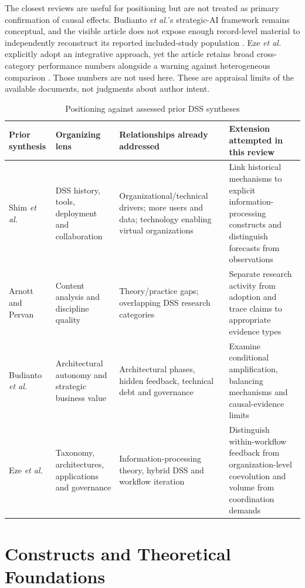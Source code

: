 \documentclass[journal]{IEEEtran}
\begin{document}
The closest reviews are useful for positioning but are not treated as primary confirmation of causal effects. Budianto \emph{et al.}'s strategic-AI framework remains conceptual, and the visible article does not expose enough record-level material to independently reconstruct its reported included-study population \cite{Budianto2026}. Eze \emph{et al.} explicitly adopt an integrative approach, yet the article retains broad cross-category performance numbers alongside a warning against heterogeneous comparison \cite{Eze2026}. Those numbers are not used here. These are appraisal limits of the available documents, not judgments about author intent.

\begin{table}[t]
\caption{Positioning against assessed prior DSS syntheses}
\label{tab:prior}
\centering\footnotesize\setlength{\tabcolsep}{4pt}
\begin{tabular}{p{}p{}p{}p{}}
\toprule
Prior synthesis & Organizing lens & Relationships already addressed & Extension attempted in this review \\
\midrule
Shim \emph{et al.} \cite{shim2002} & DSS history, tools, deployment and collaboration & Organizational/technical drivers; more users and data; technology enabling virtual organizations & Link historical mechanisms to explicit information-processing constructs and distinguish forecasts from observations \\
Arnott and Pervan \cite{arnott2008} & Content analysis and discipline quality & Theory/practice gaps; overlapping DSS research categories & Separate research activity from adoption and trace claims to appropriate evidence types \\
Budianto \emph{et al.} \cite{Budianto2026} & Architectural autonomy and strategic business value & Architectural phases, hidden feedback, technical debt and governance & Examine conditional amplification, balancing mechanisms and causal-evidence limits \\
Eze \emph{et al.} \cite{Eze2026} & Taxonomy, architectures, applications and governance & Information-processing theory, hybrid DSS and workflow iteration & Distinguish within-workflow feedback from organization-level coevolution and volume from coordination demands \\
\bottomrule
\end{tabular}
\end{table}

\section{Constructs and Theoretical Foundations}
\end{document}
